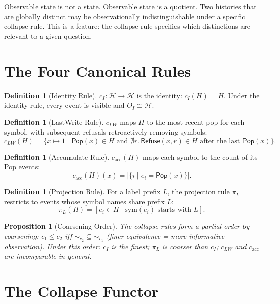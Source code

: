 \documentclass[12pt, a4paper, openany]{book}
\theoremstyle{plain}
\newtheorem{proposition}[theorem]{Proposition}
\theoremstyle{definition}
\newtheorem{definition}[theorem]{Definition}
\theoremstyle{remark}
\newcommand{\Pop}{\mathsf{Pop}}
\newcommand{\Refuse}{\mathsf{Refuse}}
\newcommand{\calH}{\mathcal{H}}
\begin{document}
Observable state is not a state. Observable state is a quotient. Two histories
that are globally distinct may be observationally indistinguishable under a
specific collapse rule. This is a feature: the collapse rule specifies which
distinctions are relevant to a given question.

\section{The Four Canonical Rules}

\begin{definition}[Identity Rule]
$c_I : \calH \to \calH$ is the identity: $c_I(H) = H$. Under the identity rule,
every event is visible and $O_I \cong \calH$.
\end{definition}

\begin{definition}[LastWrite Rule]
$c_{LW}$ maps $H$ to the most recent pop for each symbol, with subsequent refusals
retroactively removing symbols:
\[
c_{LW}(H) = \{x \mapsto 1 \mid \Pop(x) \in H \text{ and } \nexists r.\, \Refuse(x,r) \in H \text{ after the last } \Pop(x)\}.
\]
\end{definition}

\begin{definition}[Accumulate Rule]
$c_{\mathrm{acc}}(H)$ maps each symbol to the count of its Pop events:
\[
c_{\mathrm{acc}}(H)(x) = |\{i \mid e_i = \Pop(x)\}|.
\]
\end{definition}

\begin{definition}[Projection Rule]
For a label prefix $L$, the projection rule $\pi_L$ restricts to events whose
symbol names share prefix $L$:
\[
\pi_L(H) = [e_i \in H \mid \mathrm{sym}(e_i) \text{ starts with } L].
\]
\end{definition}

\begin{proposition}[Coarsening Order]
The collapse rules form a partial order by coarsening: $c_1 \leq c_2$ iff
${\sim_{c_2}} \subseteq {\sim_{c_1}}$ (finer equivalence = more informative
observation). Under this order: $c_I$ is the finest; $\pi_L$ is coarser than
$c_I$; $c_{LW}$ and $c_{\mathrm{acc}}$ are incomparable in general.
\end{proposition}

\section{The Collapse Functor}
\end{document}

